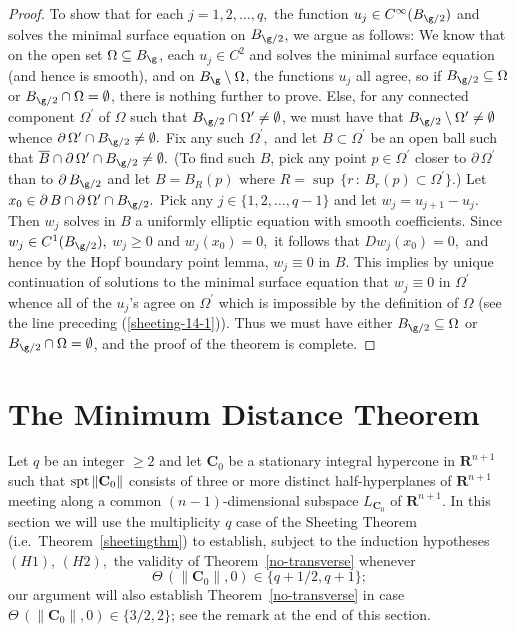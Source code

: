\documentclass[a4paper,11pt]{amsart}
\begin{document}
\begin{proof}
To show that for each $j =1, 2, \ldots, q,$ the function $u_{j} \in C^{\infty}(B_{\g/2})$ and solves the minimal surface equation on $B_{\g/2}$, we argue as follows: We know that on the open set $\Omega \subseteq B_{\g}$, each $u_{j} \in C^{2}$  and solves the minimal surface equation (and hence is smooth), and on $B_{\g} \setminus \Omega$, the functions $u_{j}$ all agree, so if $B_{\g/2} \subseteq \Omega$ or $B_{\g/2} \cap \Omega = \emptyset$, there is nothing further to prove. Else, for any connected component $\Omega^{\prime}$ of $\Omega$ such that $B_{\g/2} \cap \Omega^{\prime} \neq \emptyset$, we must have that $B_{\g/2} \setminus \Omega^{\prime} \neq \emptyset$  whence $\partial \, \Omega^{\prime} \cap B_{\g/2} \neq \emptyset.$ Fix any such $\Omega^{\prime},$ and let $B \subset \Omega^{\prime}$ be an open ball such that ${\overline B} \cap \partial \, \Omega^{\prime} \cap B_{\g/2} \neq \emptyset.$ (To find such $B$, pick any point $p \in \Omega^{\prime}$ closer to $\partial \, \Omega^{\prime}$ than to $\partial \, B_{\g/2}$ and 
let $B = B_{R}(p)$ where $R = \sup \, \{r  \, : \, B_{r}(p) \subset \Omega^{\prime}\}$.) Let $x_{0} \in \partial \, B \cap \partial \, \Omega^{\prime} \cap B_{\g/2}.$ Pick any $j \in \{1, 2, \ldots, q-1\}$ and let 
$w_{j} = u_{j+1} - u_{j}$.  Then  $w_{j}$ solves in $B$ a uniformly elliptic equation with smooth coefficients. Since 
$w_{j} \in C^{1}(B_{\g/2}),$ $w_{j} \geq 0$ and  $w_{j}(x_{0}) = 0,$ it follows that $Dw_{j}(x_{0}) = 0,$ and hence by the Hopf boundary point lemma, $w_{j} \equiv 0$ in $B.$ This implies by unique continuation of solutions to the minimal surface equation that $w_{j} \equiv 0$ in $\Omega^{\prime}$  whence all of the $u_{j}$'s agree on $\Omega^{\prime}$ which is impossible by the definition of $\Omega$ (see the line preceding (\ref{sheeting-14-1})). Thus we must have either $B_{\g/2} \subseteq \Omega$ or $B_{\g/2} \cap \Omega  = \emptyset$, and the proof of the theorem is complete. 
\end{proof}



\section{The Minimum Distance Theorem}\label{MD}
\setcounter{equation}{0}

Let $q$ be an integer $\geq 2$ and let ${\mathbf C}_{0}$ be a stationary integral hypercone in ${\mathbf R}^{n+1}$ such that ${\rm spt} \, \|{\mathbf C}_{0}\|$ consists of three or more distinct half-hyperplanes of ${\mathbf R}^{n+1}$ meeting along a common $(n-1)$-dimensional 
subspace $L_{{\mathbf C}_{0}}$ of ${\mathbf R}^{n+1}.$ In this section we will use the multiplicity $q$ case of the Sheeting Theorem (i.e.\ Theorem~\ref{sheetingthm}) to establish, subject to the induction hypotheses $(H1)$, $(H2),$ the validity of Theorem~\ref{no-transverse}  whenever
\begin{equation}\label{MD-0}
\Theta \, (\|{\mathbf C}_{0}\|, 0)  \in \{q+1/2, q+1\};
\end{equation}
our argument will also establish Theorem~\ref{no-transverse} in case $\Theta \, (\|{\mathbf C}_{0}\|, 0) \in \{3/2, 2\}$; see the remark at the end of this section.
\end{document}
